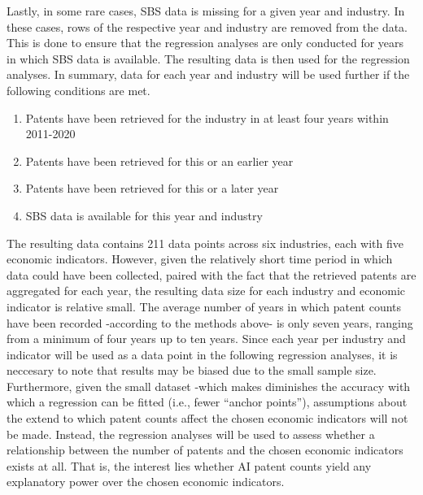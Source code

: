 \documentclass[
  11,
  a4paperpaper,
]{article}
\providecommand{\tightlist}{%
  \setlength{\itemsep}{0pt}\setlength{\parskip}{0pt}}\usepackage{longtable,booktabs,array}
\begin{document}
Lastly, in some rare cases, SBS data is missing for a given year and
industry. In these cases, rows of the respective year and industry are
removed from the data. This is done to ensure that the regression
analyses are only conducted for years in which SBS data is available.
The resulting data is then used for the regression analyses. In summary,
data for each year and industry will be used further if the following
conditions are met.

\begin{enumerate}
\def\labelenumi{\arabic{enumi}.}
\tightlist
\item
  Patents have been retrieved for the industry in at least four years
  within 2011-2020
\item
  Patents have been retrieved for this or an earlier year
\item
  Patents have been retrieved for this or a later year
\item
  SBS data is available for this year and industry
\end{enumerate}

The resulting data contains 211 data points across six industries, each
with five economic indicators. However, given the relatively short time
period in which data could have been collected, paired with the fact
that the retrieved patents are aggregated for each year, the resulting
data size for each industry and economic indicator is relative small.
The average number of years in which patent counts have been recorded
-according to the methods above- is only seven years, ranging from a
minimum of four years up to ten years. Since each year per industry and
indicator will be used as a data point in the following regression
analyses, it is neccesary to note that results may be biased due to the
small sample size. Furthermore, given the small dataset -which makes
diminishes the accuracy with which a regression can be fitted (i.e.,
fewer ``anchor points''), assumptions about the extend to which patent
counts affect the chosen economic indicators will not be made. Instead,
the regression analyses will be used to assess whether a relationship
between the number of patents and the chosen economic indicators exists
at all. That is, the interest lies whether AI patent counts yield any
explanatory power over the chosen economic indicators.
\end{document}

